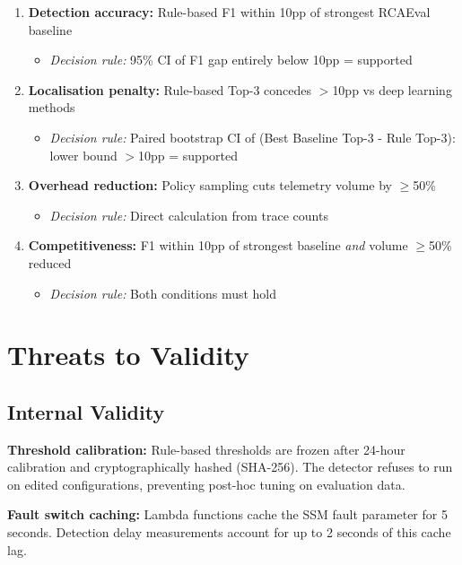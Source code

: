\begin{enumerate}
    \item \textbf{Detection accuracy:} Rule-based F1 within 10pp of strongest RCAEval baseline
    \begin{itemize}
        \item \textit{Decision rule:} 95\% CI of F1 gap entirely below 10pp = supported
    \end{itemize}
    
    \item \textbf{Localisation penalty:} Rule-based Top-3 concedes $>$10pp vs deep learning methods
    \begin{itemize}
        \item \textit{Decision rule:} Paired bootstrap CI of (Best Baseline Top-3 - Rule Top-3): lower bound $>$10pp = supported
    \end{itemize}
    
    \item \textbf{Overhead reduction:} Policy sampling cuts telemetry volume by $\geq$50\%
    \begin{itemize}
        \item \textit{Decision rule:} Direct calculation from trace counts
    \end{itemize}
    
    \item \textbf{Competitiveness:} F1 within 10pp of strongest baseline \textit{and} volume $\geq$50\% reduced
    \begin{itemize}
        \item \textit{Decision rule:} Both conditions must hold
    \end{itemize}
\end{enumerate}

\section{Threats to Validity}

\subsection{Internal Validity}

\textbf{Threshold calibration:} Rule-based thresholds are frozen after 24-hour calibration and cryptographically hashed (SHA-256). The detector refuses to run on edited configurations, preventing post-hoc tuning on evaluation data.

\textbf{Fault switch caching:} Lambda functions cache the SSM fault parameter for 5 seconds. Detection delay measurements account for up to 2 seconds of this cache lag.

